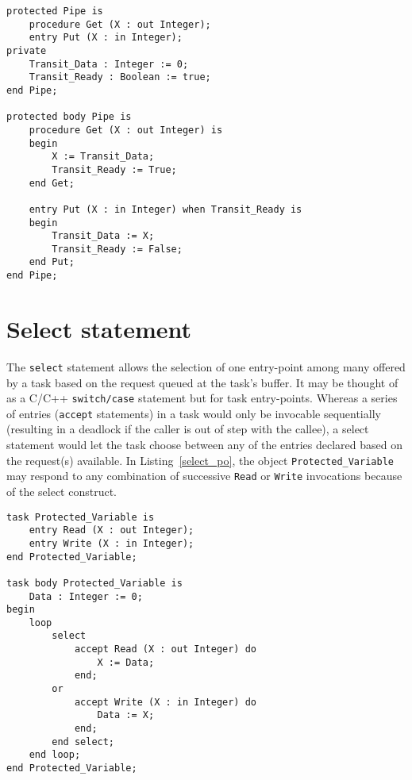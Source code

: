 \begin{minipage}{\listingwidth}
\lstset{language=ada}
\begin{lstlisting}[caption=Pipe IPC construct for two multiple tasks
    with a buffer size of 1.,label=prod_consumer]
protected Pipe is
	procedure Get (X : out Integer);
	entry Put (X : in Integer);
private
	Transit_Data : Integer := 0;
	Transit_Ready : Boolean := true;
end Pipe;

protected body Pipe is
	procedure Get (X : out Integer) is
	begin
		X := Transit_Data;		
		Transit_Ready := True;
	end Get;

	entry Put (X : in Integer) when Transit_Ready is
	begin
		Transit_Data := X;
		Transit_Ready := False;
	end Put;
end Pipe;
\end{lstlisting}
\end{minipage}

\section{Select statement}
The \texttt{select} statement allows the selection of one entry-point
among many offered by a task based on the request queued at the task's
buffer. It may be thought of as a C/C++ \texttt{switch/case} statement
but for task entry-points. Whereas a series of entries
(\texttt{accept} statements) in a task would only be invocable
sequentially (resulting in a deadlock if the caller is out of step
with the callee), a select statement would let the task choose between
any of the entries declared based on the request(s) available. In
Listing~\ref{select_po}, the object \texttt{Protected\_Variable} may
respond to any combination of successive \texttt{Read} or
\texttt{Write} invocations because of the select construct.

\begin{minipage}{\listingwidth}
\lstset{language=ada}
\begin{lstlisting}[caption=Protected variable implemented as a task
    with select entries.,label=select_po]
task Protected_Variable is
	entry Read (X : out Integer);
	entry Write (X : in Integer);
end Protected_Variable;

task body Protected_Variable is
	Data : Integer := 0;		
begin
	loop
		select
			accept Read (X : out Integer) do
				X := Data;
			end;
		or
			accept Write (X : in Integer) do
				Data := X;
			end;
		end select;
	end loop;
end Protected_Variable;
\end{lstlisting}
\end{minipage}
